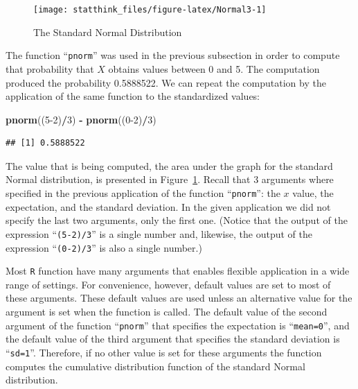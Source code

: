 \documentclass[
]{krantz}
\makeatletter
\newenvironment{Shaded}{\begin{snugshade}}{\end{snugshade}}
\newcommand{\DecValTok}[1]{\textcolor[rgb]{0.00,0.00,0.81}{#1}}
\newcommand{\KeywordTok}[1]{\textcolor[rgb]{0.13,0.29,0.53}{\textbf{#1}}}
\newcommand{\NormalTok}[1]{#1}
\newcommand{\OperatorTok}[1]{\textcolor[rgb]{0.81,0.36,0.00}{\textbf{#1}}}
\newcommand{\StringTok}[1]{\textcolor[rgb]{0.31,0.60,0.02}{#1}}
\newenvironment{kframe}{%
\medskip{}
\setlength{\fboxsep}{.8em}
 \def\at@end@of@kframe{}%
 \ifinner\ifhmode%
  \def\at@end@of@kframe{\end{minipage}}%
  \begin{minipage}{\columnwidth}%
 \fi\fi%
 \def\FrameCommand##1{\hskip\@totalleftmargin \hskip-\fboxsep
 \colorbox{shadecolor}{##1}\hskip-\fboxsep
     \hskip-\linewidth \hskip-\@totalleftmargin \hskip\columnwidth}%
 \MakeFramed {\advance\hsize-\width
   \@totalleftmargin\z@ \linewidth\hsize
   \@setminipage}}%
 {\par\unskip\endMakeFramed%
 \at@end@of@kframe}
\renewenvironment{Shaded}{\begin{kframe}}{\end{kframe}}
\theoremstyle{definition}
\theoremstyle{definition}
\theoremstyle{definition}
\theoremstyle{remark}
\makeatother
\begin{document}
\begin{figure}

{\centering \texttt{[image: statthink\_files/figure-latex/Normal3-1]} 

}

\caption{The Standard Normal Distribution}\label{fig:Normal3}
\end{figure}

The function ``\texttt{pnorm}'' was used in the previous subsection in order to
compute that probability that \(X\) obtains values between 0 and 5. The
computation produced the probability 0.5888522. We can repeat the
computation by the application of the same function to the standardized
values:

\begin{Shaded}
\begin{Highlighting}[]
\KeywordTok{pnorm}\NormalTok{((}\DecValTok{5-2}\NormalTok{)}\OperatorTok{/}\DecValTok{3}\NormalTok{) }\OperatorTok{-}\StringTok{ }\KeywordTok{pnorm}\NormalTok{((}\DecValTok{0-2}\NormalTok{)}\OperatorTok{/}\DecValTok{3}\NormalTok{)}
\end{Highlighting}
\end{Shaded}

\begin{verbatim}
## [1] 0.5888522
\end{verbatim}

The value that is being computed, the area under the graph for the
standard Normal distribution, is presented in Figure~\ref{fig:Normal3}.
Recall that 3 arguments where specified in the previous application of
the function ``\texttt{pnorm}'': the \(x\) value, the expectation, and the standard
deviation. In the given application we did not specify the last two
arguments, only the first one. (Notice that the output of the expression
``\texttt{(5-2)/3}'' is a single number and, likewise, the output of the
expression ``\texttt{(0-2)/3}'' is also a single number.)

Most \texttt{R} function have many arguments that enables flexible application
in a wide range of settings. For convenience, however, default values
are set to most of these arguments. These default values are used unless
an alternative value for the argument is set when the function is
called. The default value of the second argument of the function
``\texttt{pnorm}'' that specifies the expectation is ``\texttt{mean=0}'', and the default
value of the third argument that specifies the standard deviation is
``\texttt{sd=1}''. Therefore, if no other value is set for these arguments the
function computes the cumulative distribution function of the standard
Normal distribution.
\end{document}
